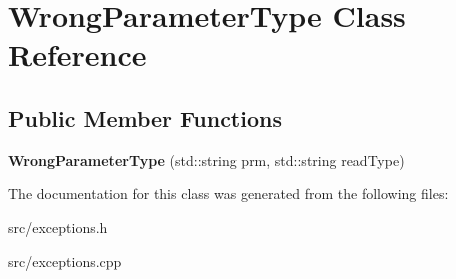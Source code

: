 \hypertarget{class_wrong_parameter_type}{
\section{WrongParameterType Class Reference}
\label{class_wrong_parameter_type}
}
\subsection*{Public Member Functions}
\begin{DoxyCompactItemize}
\item 
\hypertarget{class_wrong_parameter_type_ad0b10b3d7090e80bb2569677bdcdd6b7}{
{\bfseries WrongParameterType} (std::string prm, std::string readType)}
\label{class_wrong_parameter_type_ad0b10b3d7090e80bb2569677bdcdd6b7}

\end{DoxyCompactItemize}


The documentation for this class was generated from the following files:\begin{DoxyCompactItemize}
\item 
src/exceptions.h\item 
src/exceptions.cpp\end{DoxyCompactItemize}
